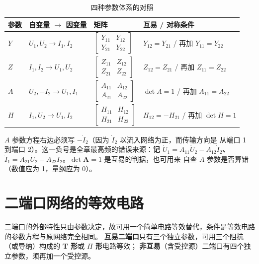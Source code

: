 \begin{table}[htbp]
  \centering
  \renewcommand{\tablename}{表}%
  \caption{四种参数体系的对照}
  \begin{tabular}{llll}
    \toprule
    参数 & 自变量 $\to$ 因变量 & 矩阵 & 互易 / 对称条件 \\
    \midrule
    $Y$ & $U_1,U_2\to I_1,I_2$ & $\begin{bmatrix}Y_{11}&Y_{12}\\ Y_{21}&Y_{22}\end{bmatrix}$ & $Y_{12}=Y_{21}$ / 再加 $Y_{11}=Y_{22}$ \\
    $Z$ & $I_1,I_2\to U_1,U_2$ & $\begin{bmatrix}Z_{11}&Z_{12}\\ Z_{21}&Z_{22}\end{bmatrix}$ & $Z_{12}=Z_{21}$ / 再加 $Z_{11}=Z_{22}$ \\
    $A$ & $U_2,-I_2\to U_1,I_1$ & $\begin{bmatrix}A_{11}&A_{12}\\ A_{21}&A_{22}\end{bmatrix}$ & $\det A=1$ / 再加 $A_{11}=A_{22}$ \\
    $H$ & $I_1,U_2\to U_1,I_2$ & $\begin{bmatrix}H_{11}&H_{12}\\ H_{21}&H_{22}\end{bmatrix}$ & $H_{12}=-H_{21}$ / 再加 $\det H=1$ \\
    \bottomrule
  \end{tabular}
\end{table}

\begin{corepoint}{$A$ 参数方程右边必须写 $-\dot{I}_2$（因为 $\dot{I}_2$ 以流入网络为正，而传输方向是
从端口 1 到端口 2）。这一负号是全章最高频的错误来源：\textbf{记 $\dot{U}_1=A_{11}\dot{U}_2-A_{12}\dot{I}_2$、
$\dot{I}_1=A_{21}\dot{U}_2-A_{22}\dot{I}_2$}。$\det\boldsymbol{A}=1$ 是互易的判据，也可用来
自查 $A$ 参数是否算错（数值应为 1，量纲应为 0）。}
\end{corepoint}

\section{二端口网络的等效电路}

二端口的外部特性只由参数决定，故可用一个简单电路等效替代，条件是等效电路的参数方程与原网络完全相同。
\textbf{互易二端口}只有三个独立参数，可用三个阻抗（或导纳）构成的 \textbf{T 形}或 \textbf{$\Pi$ 形}电路等效；
\textbf{非互易}（含受控源）二端口有四个独立参数，须再加一个受控源。

